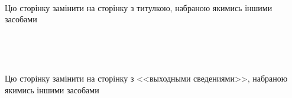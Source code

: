 \documentclass[14pt,a4paper]{extarticle}
\renewcommand{\baselinestretch}{1.3125}
\begin{document}
\def\myhrulefill{\vspace{12mm}\par\vspace*{-12mm}\par\hrulefill}

\newenvironment{problemAllDefault}[1]{\vspace{10mm}\par\begin{problem}{#1}{Клавіатура (stdin)}{Екран (stdout)}{1 сек}{64 мегабайти}}{\end{problem}}



\begin{center}

\begin{huge}

~

\vfill

Цю сторінку замінити на сторінку з титулкою, набраною якимись іншими засобами

\vfill

~

\clearpage

~

\vfill

Цю сторінку замінити на сторінку з <<выходными сведениями>>, набраною якимись іншими засобами

\vfill

~

\end{huge}

\end{center}

\clearpage














\tableofcontents
\end{document}
